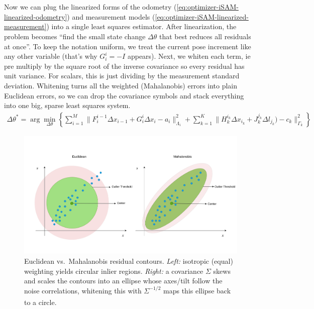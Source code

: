 \\ \\
Now we can plug the linearized forms of the odometry (\ref{eq:optimizer-iSAM-linearized-odometry}) and measurement models (\ref{eq:optimizer-iSAM-linearized-measurement}) into a single least squares estimator. After linearization, the problem becomes ``find the small state change $\Delta\theta$ that best reduces all residuals at once''. To keep the notation uniform, we treat the current pose increment like any other variable (that's why $G_{i}^{i}=-I$ appears). Next, we whiten each term, ie pre multiply by the square root of the inverse covariance so every residual has unit variance. For scalars, this is just dividing by the measurement standard deviation. Whitening turns all the weighted (Mahalanobis) errors into plain Euclidean errors, so we can drop the covariance symbols and stack everything into one big, sparse least squares system.
\begin{equation}
    \begin{aligned}
        \Delta\theta^{*} = 
        \arg\min_{\Delta\theta}\left\{ 
            \sum_{i=1}^{M}{\|F_{i}^{i-1}\Delta x_{i-1} + G_{i}^{i}\Delta x_{i} - a_i\|_{\Lambda_i}^{2}} +
            \sum_{k=1}^{K}{\|H_{k}^{i_k}\Delta x_{i_k} + J_{k}^{j_k} \Delta l_{j_k}) - c_k\|_{\Gamma_k}^{2}}
            \right\}
    \end{aligned}
    \label{eq:optimizer-iSAM-delta-theta-star-mahalanobis-form}
\end{equation}
\begin{figure}[H]
    \centering
    \includegraphics[width=0.9\linewidth]{Pictures/Optimizers/iSAM/Mahalanobis_Distance.png}
    \caption{Euclidean vs.\ Mahalanobis residual contours. \textit{Left:} isotropic (equal) weighting yields circular inlier regions. \textit{Right:} a covariance $\Sigma$ skews and scales the contours into an ellipse whose axes/tilt follow the noise correlations, whitening this with $\Sigma^{-1/2}$ maps this ellipse back to a circle.\textsuperscript{\cite{mahalanobis_distance_explained}}}
    \label{fig:mahalanobis-distance}
\end{figure}
